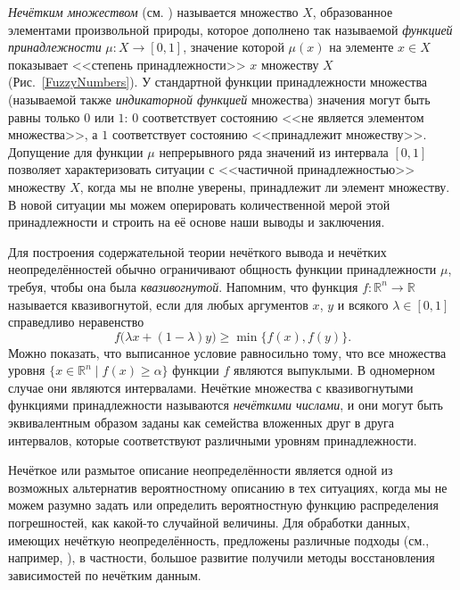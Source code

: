 \documentclass[a5paper,openany]{book}
\newcommand{\mbb}{\mathbb}
\begin{document}

\emph{Нечётким множеством} (см. \cite{DuboisPrade,Zadeh}) называется множество $X$, 
образованное элементами произвольной природы, которое дополнено так называемой 
\emph{функцией принадлежности} $\mu: X\to[0, 1]$, значение которой $\mu(x)$ на элементе 
$x\in X$ показывает <<степень принадлежности>> $x$ множеству $X$ (Рис.~\ref{FuzzyNumbers}). 
У стандартной функции принадлежности множества (называемой также \emph{индикаторной 
функцией} множества) значения могут быть равны только $0$ или $1$: $0$ соответствует 
состоянию <<не является элементом множества>>, а $1$ соответствует состоянию <<принадлежит
множеству>>. Допущение для функции $\mu$ непрерывного ряда значений из интервала $[0, 1]$ 
позволяет характеризовать ситуации с <<частичной принадлежностью>> множеству $X$, когда 
мы не вполне уверены, принадлежит ли элемент множеству. В новой ситуации мы можем 
оперировать количественной мерой этой принадлежности и строить на её основе наши 
выводы и заключения.  
  
Для построения содержательной теории нечёткого вывода и нечётких неопределённостей 
обычно ограничивают общность функции принадлежности $\mu$, требуя, чтобы она была 
\emph{квазивогнутой}. Напомним, что функция $f:\mbb{R}^{n}\to\mbb{R}$ называется 
квазивогнутой, если для любых аргументов $x$, $y$ и всякого $\lambda\in[0, 1]$ 
справедливо неравенство 
\begin{equation*} 
f\bigl(\lambda x+(1-\lambda )y\bigr) \geq \min\bigl\{ f(x), f(y) \bigr\}.
\end{equation*} 
Можно показать, что выписанное условие равносильно тому, что все множества уровня 
$\{ x\in\mbb{R}^{n} \mid f(x)\geq\alpha \}$ функции $f$ являются выпуклыми. 
В одномерном случае они являются интервалами. Нечёткие множества с квазивогнутыми 
функциями принадлежности называются \emph{нечёткими числами}, и они могут быть 
эквивалентным образом заданы как семейства вложенных друг в друга интервалов, 
которые соответствуют различными уровням принадлежности.   
  
Нечёткое или размытое описание неопределённости является одной из возможных альтернатив 
вероятностному описанию в тех ситуациях, когда мы не можем разумно задать или определить 
вероятностную функцию распределения погрешностей, как какой-то случайной величины. 
Для обработки данных, имеющих нечёткую неопределённость, предложены различные подходы 
(см., например, \cite{Semenov2012, SemenovKK16,NguyenKreinWuXiang}), в частности, 
большое развитие получили методы восстановления зависимостей по нечётким данным. 
   
\end{document}
